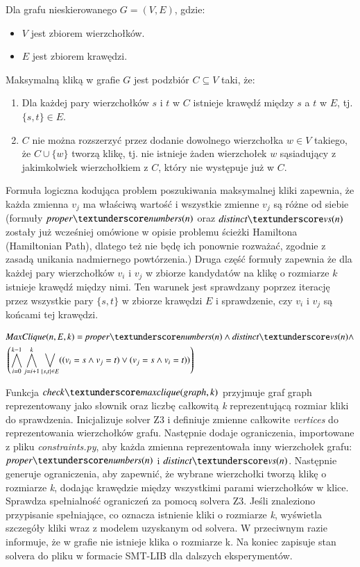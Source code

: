 Dla grafu nieskierowanego $G = (V, E)$, gdzie:
\begin{itemize}
 	\item \(V\) jest zbiorem wierzchołków.
 	\item \(E\) jest zbiorem krawędzi.
\end{itemize}
Maksymalną kliką w grafie \(G\) jest podzbiór $C \subseteq V$ taki, że:
\begin{enumerate}
 	\item Dla każdej pary wierzchołków \(s\) i \(t\) w \(C\) istnieje krawędź między \(s\) a \(t\) w \(E\), tj. $\{s, t\}\in E$. 
 	\item \(C\) nie można rozszerzyć przez dodanie dowolnego wierzchołka $w\in V$ takiego, że $C \cup \{w\}$ tworzą klikę, tj. nie istnieje żaden wierzchołek \(w\) sąsiadujący z jakimkolwiek wierzchołkiem z \(C\), który nie występuje już w \(C\).
\end{enumerate}

Formuła logiczna kodująca problem poszukiwania maksymalnej kliki zapewnia, że każda zmienna \(v_j\) ma właściwą wartość i wszystkie zmienne \(v_j\) są różne od siebie (formuły $\propernumbers$ oraz $\distinctvs$ zostały już wcześniej omówione w opisie problemu ścieżki Hamiltona (Hamiltonian Path), dlatego też nie będę ich ponownie rozważać, zgodnie z zasadą unikania nadmiernego powtórzenia.) Druga część formuły zapewnia że dla każdej pary wierzchołków \(v_i\) i \(v_j\) w zbiorze kandydatów na klikę o rozmiarze \(k\) istnieje krawędź między nimi. Ten warunek jest sprawdzany poprzez iterację przez wszystkie pary $\{s,t\}$ w zbiorze krawędzi \(E\) i sprawdzenie, czy \(v_i\) i \(v_j\) są końcami tej krawędzi.

\begin{align*}
	&\MaxClique(n, E, k) = \propernumbers  \land \distinctvs  \land \\
	&\left( \bigwedge_{i=0}^{k-1} \bigwedge_{j=i+1}^{k} \bigvee_{\{s,t\} \in E} ((v_i = s \land v_j = t) \lor (v_j = s \land v_i = t)) \right)	
\end{align*}

Funkcja $\checkclique$ przyjmuje graf graph reprezentowany jako słownik oraz liczbę całkowitą \textit{k} reprezentującą rozmiar kliki do sprawdzenia. Inicjalizuje solver Z3 i definiuje zmienne całkowite \textit{vertices} do reprezentowania wierzchołków grafu. Następnie dodaje ograniczenia, importowane z pliku \textit{constraints.py}, aby każda zmienna reprezentowała inny wierzchołek grafu: $\propernumbers$ i $\distinctvs$. Następnie generuje ograniczenia, aby zapewnić, że wybrane wierzchołki tworzą klikę o rozmiarze \textit{k}, dodając krawędzie między wszystkimi parami wierzchołków w klice. Sprawdza spełnialność ograniczeń za pomocą solvera Z3. Jeśli znaleziono przypisanie spełniające, co oznacza istnienie kliki o rozmiarze \textit{k}, wyświetla szczegóły kliki wraz z modelem uzyskanym od solvera. W przeciwnym razie informuje, że w grafie nie istnieje klika o rozmiarze k. Na koniec zapisuje stan solvera do pliku w formacie SMT-LIB dla dalszych eksperymentów.

